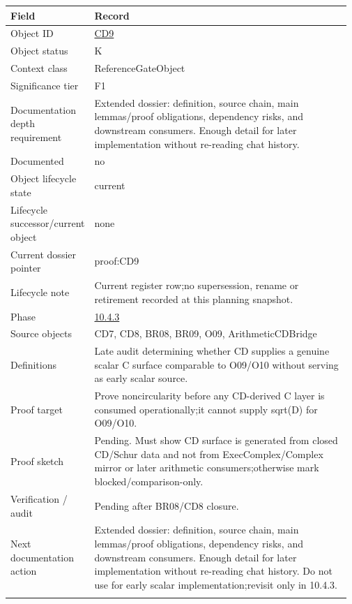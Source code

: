 \begin{longtable}{L{0.16\linewidth} L{0.81\linewidth}}
\hline
\textbf{Field} & \textbf{Record}\\
\hline
Object ID & \hyperlink{object-row-CD9}{CD9}\\
\hline\addlinespace[0.20em]
Object status & K\\
\hline\addlinespace[0.20em]
Context class & ReferenceGateObject\\
\hline\addlinespace[0.20em]
Significance tier & F1\\
\hline\addlinespace[0.20em]
Documentation depth requirement & Extended dossier: definition, source chain, main lemmas/\allowbreak{}proof obligations, dependency risks, and downstream consumers. Enough detail for later implementation without re-reading chat history.\\
\hline\addlinespace[0.20em]
Documented & no\\
\hline\addlinespace[0.20em]
Object lifecycle state & current\\
\hline\addlinespace[0.20em]
Lifecycle successor/\allowbreak{}current object & none\\
\hline\addlinespace[0.20em]
Current dossier pointer & proof:CD9\\
\hline\addlinespace[0.20em]
Lifecycle note & Current register row;\newline no supersession, rename or retirement recorded at this planning snapshot.\\
\hline\addlinespace[0.20em]
Phase & \hyperlink{phase-row-10-4-3}{10.4.3}\\
\hline\addlinespace[0.20em]
Source objects & CD7, CD8, BR08, BR09, O09, ArithmeticCDBridge\\
\hline\addlinespace[0.20em]
Definitions & Late audit determining whether CD supplies a genuine scalar C surface comparable to O09/\allowbreak{}O10 without serving as early scalar source.\\
\hline\addlinespace[0.20em]
Proof target & Prove noncircularity before any CD-derived C layer is consumed operationally;\newline it cannot supply sqrt(D) for O09/\allowbreak{}O10.\\
\hline\addlinespace[0.20em]
Proof sketch & Pending. Must show CD surface is generated from closed CD/\allowbreak{}Schur data and not from ExecComplex/\allowbreak{}Complex mirror or later arithmetic consumers;\newline otherwise mark blocked/\allowbreak{}comparison-only.\\
\hline\addlinespace[0.20em]
Verification /\allowbreak{} audit & Pending after BR08/\allowbreak{}CD8 closure.\\
\hline\addlinespace[0.20em]
Next documentation action & Extended dossier: definition, source chain, main lemmas/\allowbreak{}proof obligations, dependency risks, and downstream consumers. Enough detail for later implementation without re-reading chat history. Do not use for early scalar implementation;\newline revisit only in 10.4.3.\\
\hline\addlinespace[0.20em]
\end{longtable}
